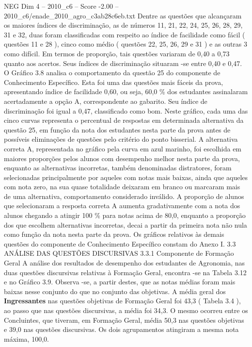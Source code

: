 \begin{textsample}{NEG Dim 4 – 2010\_c6 – Score -2.00 – 2010\_c6/enade\_2010\_agro\_c3ab28c6eb.txt}
Dentre as questões que alcançaram os maiores índices de discriminação, as de números 11, 21, 22, 24, 25, 26, 28, 29, 31 e 32, duas foram classificadas com respeito ao índice de facilidade como fácil ( questões 11 e 28 ), cinco como médio ( questões 22, 25, 26, 29 e 31 ) e as outras 3 como difícil.
Em termos de proporção, tais questões variaram de 0,40 a 0,73 quanto aos acertos.
Seus índices de discriminação situaram -se entre 0,40 e 0,47.
O Gráfico 3.8 analisa o comportamento da questão 25 do componente de Conhecimento Específico.
Esta foi uma das questões mais fáceis da prova, apresentando índice de facilidade 0,60, ou seja, 60,0 \% dos estudantes assinalaram acertadamente a opção A, correspondente ao gabarito.
Seu índice de discriminação foi igual a 0,47, classificado como bom.
Neste gráfico, cada uma das cinco curvas representa o percentual de respostas em determinada alternativa da questão 25, em função da nota dos estudantes nesta parte da prova antes de possíveis eliminações de questões pelo critério do ponto bisserial.
A alternativa correta A, representada no gráfico pela curva em azul marinho, foi escolhida em maiores proporções pelos alunos com desempenho melhor nesta parte da prova, enquanto as alternativas incorretas, também denominadas distratores, foram selecionadas principalmente por aqueles com notas mais baixas, ainda que aqueles com nota zero, na sua quase totalidade deixaram em branco ou marcaram mais de uma alternativa, comportamento considerado inválido.
A proporção de alunos que selecionaram a resposta correta A aumenta gradativamente com a nota dos alunos chegando a atingir 100 \% para notas acima de 80,0, enquanto a proporção dos que escolhem alternativas incorretas, decai a partir da primeira nota não nula como função da nota nesta parte da prova.
Os gráficos relativos às demais questões do componente de Conhecimento Específico constam do Anexo I. 3.3 ANÁLISE DAS QUESTÕES DISCURSIVAS 3.3.1 Componente de Formação Geral A análise dos resultados de desempenho dos estudantes de Agronomia, nas duas questões discursivas relativas à Formação Geral, encontra -se na Tabela 3.12 e no Gráfico 3.9.
Observa -se, a partir destes, que as notas médias foram mais baixas nesse conjunto do que no conjunto das objetivas.
A média geral dos \textbf{Ingressantes} nas questões objetivas de Formação Geral foi 43,3 ( Tabela 3.4 ), ao passo que nas questões discursivas, a média foi 34,3.
O mesmo ocorreu entre os Concluintes, que tiveram, em Formação Geral, média 50,3 nas questões objetivas e 39,0 nas questões discursivas.
Os dois agrupamentos atingiram a mesma nota máxima, 100,0.

\end{textsample}
